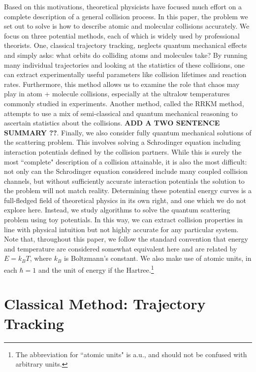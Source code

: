 \documentclass[%
 reprint,
 amsmath,amssymb,
 aps,
 nofootinbib
]{revtex4-1}
\begin{document}
Based on this motivations, theoretical physicists have focused much effort on a complete description of a general collision process. In this paper, the problem we set out to solve is how to describe atomic and molecular collisions accurately. We focus on three potential methods, each of which is widely used by professional theorists. One, classical trajectory tracking, neglects quantum mechanical effects and simply asks: what orbits do colliding atoms and molecules take? By running many individual trajectories and looking at the statistics of these collisions, one can extract experimentally useful parameters like collision lifetimes and reaction rates. Furthermore, this method allows us to examine the role that chaos may play in atom + molecule collisions, especially at the ultralow temperatures commonly studied in experiments. Another method, called the RRKM method, attempts to use a mix of semi-classical and quantum mechanical reasoning to ascertain statistics about the collisions. \textbf{ADD A TWO SENTENCE SUMMARY ??}. Finally, we also consider fully quantum mechanical solutions of the scattering problem. This involves solving a Schrodinger equation including interaction potentials defined by the collision partners. While this is surely the most ``complete" description of a collision attainable, it is also the most difficult: not only can the Schrodinger equation considered include many coupled collision channels, but without sufficiently accurate interaction potentials the solution to the problem will not match reality. Determining these potential energy curves is a full-fledged field of theoretical physics in its own right, and one which we do not explore here. Instead, we study algorithms to solve the quantum scattering problem using toy potentials. In this way, we can extract collision properties in line with physical intuition but not highly accurate for any particular system. Note that, throughout this paper, we follow the standard convention that energy and temperature are considered somewhat equivalent here and are related by $E = k_B T$, where $k_B$ is Boltzmann's constant. We also make use of atomic units, in each $\hbar = 1$ and the unit of energy if the Hartree.\footnote{The abbreviation for ``atomic units" is a.u., and should not be confused with arbitrary units.}


\section{\label{sec:ClassicalTraj} Classical Method: Trajectory Tracking}
\end{document}
